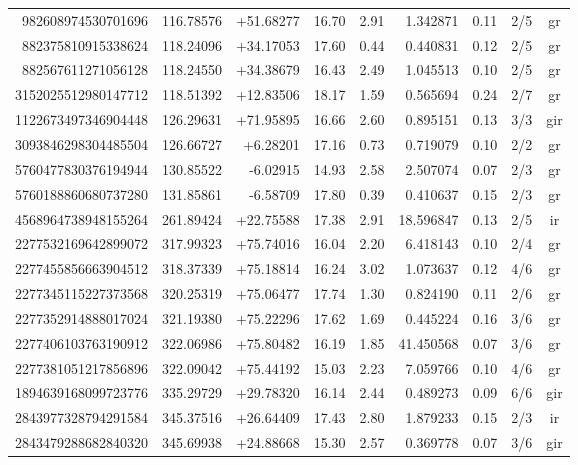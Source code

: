 \documentclass[11pt]{article}
\begin{document}
{\begin{longtable}{rrrrrrrcc}
982608974530701696 & 116.78576 & +51.68277 & 16.70 & 2.91 & 1.342871 & 0.11 & 2/5 & gr \\
882375810915338624 & 118.24096 & +34.17053 & 17.60 & 0.44 & 0.440831 & 0.12 & 2/5 & gr \\
882567611271056128 & 118.24550 & +34.38679 & 16.43 & 2.49 & 1.045513 & 0.10 & 2/5 & gr \\
3152025512980147712 & 118.51392 & +12.83506 & 18.17 & 1.59 & 0.565694 & 0.24 & 2/7 & gr \\
1122673497346904448 & 126.29631 & +71.95895 & 16.66 & 2.60 & 0.895151 & 0.13 & 3/3 & gir \\
3093846298304485504 & 126.66727 & +6.28201 & 17.16 & 0.73 & 0.719079 & 0.10 & 2/2 & gr \\
5760477830376194944 & 130.85522 & -6.02915 & 14.93 & 2.58 & 2.507074 & 0.07 & 2/3 & gr \\
5760188860680737280 & 131.85861 & -6.58709 & 17.80 & 0.39 & 0.410637 & 0.15 & 2/3 & gr \\
4568964738948155264 & 261.89424 & +22.75588 & 17.38 & 2.91 & 18.596847 & 0.13 & 2/5 & ir \\
2277532169642899072 & 317.99323 & +75.74016 & 16.04 & 2.20 & 6.418143 & 0.10 & 2/4 & gr \\
2277455856663904512 & 318.37339 & +75.18814 & 16.24 & 3.02 & 1.073637 & 0.12 & 4/6 & gr \\
2277345115227373568 & 320.25319 & +75.06477 & 17.74 & 1.30 & 0.824190 & 0.11 & 2/6 & gr \\
2277352914888017024 & 321.19380 & +75.22296 & 17.62 & 1.69 & 0.445224 & 0.16 & 3/6 & gr \\
2277406103763190912 & 322.06986 & +75.80482 & 16.19 & 1.85 & 41.450568 & 0.07 & 3/6 & gr \\
2277381051217856896 & 322.09042 & +75.44192 & 15.03 & 2.23 & 7.059766 & 0.10 & 4/6 & gr \\
1894639168099723776 & 335.29729 & +29.78320 & 16.14 & 2.44 & 0.489273 & 0.09 & 6/6 & gir \\
2843977328794291584 & 345.37516 & +26.64409 & 17.43 & 2.80 & 1.879233 & 0.15 & 2/3 & ir \\
2843479288682840320 & 345.69938 & +24.88668 & 15.30 & 2.57 & 0.369778 & 0.07 & 3/6 & gir \\
\bottomrule\end{longtable}}
\end{document}
